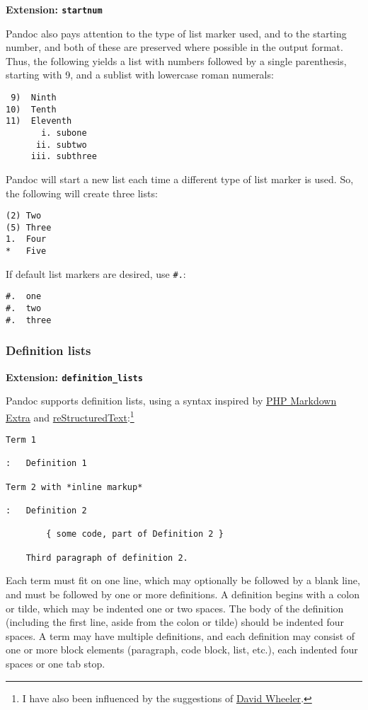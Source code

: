 \documentclass[]{article}
\begin{document}
\textbf{Extension: \texttt{startnum}}

Pandoc also pays attention to the type of list marker used, and to the
starting number, and both of these are preserved where possible in the
output format. Thus, the following yields a list with numbers followed
by a single parenthesis, starting with 9, and a sublist with lowercase
roman numerals:

\begin{verbatim}
 9)  Ninth
10)  Tenth
11)  Eleventh
       i. subone
      ii. subtwo
     iii. subthree
\end{verbatim}

Pandoc will start a new list each time a different type of list marker
is used. So, the following will create three lists:

\begin{verbatim}
(2) Two
(5) Three
1.  Four
*   Five
\end{verbatim}

If default list markers are desired, use \texttt{\#.}:

\begin{verbatim}
#.  one
#.  two
#.  three
\end{verbatim}

\subsubsection{Definition lists}

\textbf{Extension: \texttt{definition\_lists}}

Pandoc supports definition lists, using a syntax inspired by
\href{http://www.michelf.com/projects/php-markdown/extra/}{PHP Markdown
Extra} and
\href{http://docutils.sourceforge.net/docs/ref/rst/introduction.html}{reStructuredText}:\footnote{I
  have also been influenced by the suggestions of
  \href{http://www.justatheory.com/computers/markup/modest-markdown-proposal.html}{David
  Wheeler}.}

\begin{verbatim}
Term 1

:   Definition 1

Term 2 with *inline markup*

:   Definition 2

        { some code, part of Definition 2 }

    Third paragraph of definition 2.
\end{verbatim}

Each term must fit on one line, which may optionally be followed by a
blank line, and must be followed by one or more definitions. A
definition begins with a colon or tilde, which may be indented one or
two spaces. The body of the definition (including the first line, aside
from the colon or tilde) should be indented four spaces. A term may have
multiple definitions, and each definition may consist of one or more
block elements (paragraph, code block, list, etc.), each indented four
spaces or one tab stop.
\end{document}
